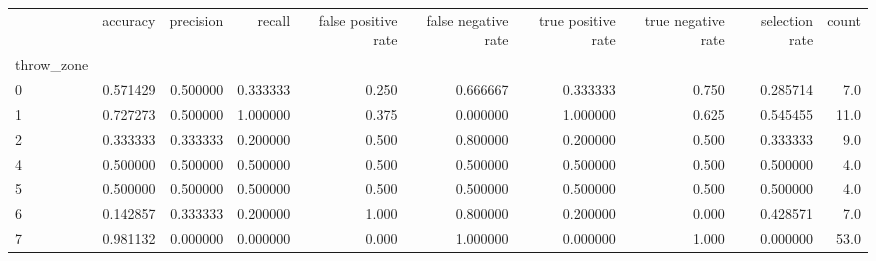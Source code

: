 \begin{tabular}{lrrrrrrrrr}
\toprule
{} &  accuracy &  precision &    recall &  false positive rate &  false negative rate &  true positive rate &  true negative rate &  selection rate &  count \\
throw\_zone &           &            &           &                      &                      &                     &                     &                 &        \\
\midrule
0          &  0.571429 &   0.500000 &  0.333333 &                0.250 &             0.666667 &            0.333333 &               0.750 &        0.285714 &    7.0 \\
1          &  0.727273 &   0.500000 &  1.000000 &                0.375 &             0.000000 &            1.000000 &               0.625 &        0.545455 &   11.0 \\
2          &  0.333333 &   0.333333 &  0.200000 &                0.500 &             0.800000 &            0.200000 &               0.500 &        0.333333 &    9.0 \\
4          &  0.500000 &   0.500000 &  0.500000 &                0.500 &             0.500000 &            0.500000 &               0.500 &        0.500000 &    4.0 \\
5          &  0.500000 &   0.500000 &  0.500000 &                0.500 &             0.500000 &            0.500000 &               0.500 &        0.500000 &    4.0 \\
6          &  0.142857 &   0.333333 &  0.200000 &                1.000 &             0.800000 &            0.200000 &               0.000 &        0.428571 &    7.0 \\
7          &  0.981132 &   0.000000 &  0.000000 &                0.000 &             1.000000 &            0.000000 &               1.000 &        0.000000 &   53.0 \\
\bottomrule
\end{tabular}
